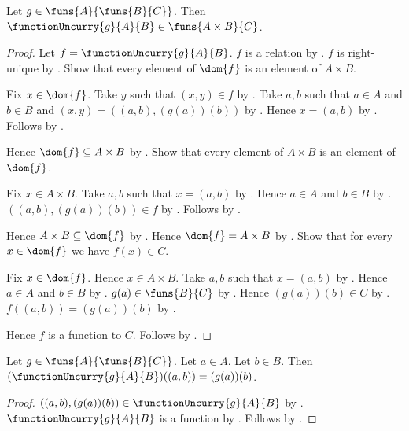 \begin{proposition}\label{function_uncurry_type}
    Let $g\in\funs{A}{\funs{B}{C}}$.
    Then $\functionUncurry{g}{A}{B}\in\funs{A\times B}{C}$.
\end{proposition}
\begin{proof}
    Let $f=\functionUncurry{g}{A}{B}$.
    $f$ is a relation by .
    $f$ is right-unique
        by .
    Show that every element of $\dom{f}$ is an element of $A\times B$.
    \begin{subproof}
        Fix $x\in\dom{f}$.
        Take $y$ such that $(x,y)\in f$ by .
        Take $a,b$ such that $a\in A$ and $b\in B$ and
            $(x,y)=((a,b),(g(a))(b))$ by .
        Hence $x=(a,b)$ by .
        Follows by .
    \end{subproof}
    Hence $\dom{f}\subseteq A\times B$ by .
    Show that every element of $A\times B$ is an element of $\dom{f}$.
    \begin{subproof}
        Fix $x\in A\times B$.
        Take $a,b$ such that $x=(a,b)$ by .
        Hence $a\in A$ and $b\in B$ by .
        $((a,b),(g(a))(b))\in f$ by .
        Follows by .
    \end{subproof}
    Hence $A\times B\subseteq\dom{f}$ by .
    Hence $\dom{f}=A\times B$ by .
    Show that for every $x\in\dom{f}$ we have $f(x)\in C$.
    \begin{subproof}
        Fix $x\in\dom{f}$.
        Hence $x\in A\times B$.
        Take $a,b$ such that $x=(a,b)$ by .
        Hence $a\in A$ and $b\in B$ by .
        $g(a)\in\funs{B}{C}$ by .
        Hence $(g(a))(b)\in C$ by .
        $f((a,b))=(g(a))(b)$
            by .
    \end{subproof}
    Hence $f$ is a function to $C$.
    Follows by .
\end{proof}

\begin{proposition}\label{function_uncurry_application}
    Let $g\in\funs{A}{\funs{B}{C}}$.
    Let $a\in A$.
    Let $b\in B$.
    Then $(\functionUncurry{g}{A}{B})((a,b))=(g(a))(b)$.
\end{proposition}
\begin{proof}
    $((a,b),(g(a))(b))\in\functionUncurry{g}{A}{B}$
        by .
    $\functionUncurry{g}{A}{B}$ is a function
        by .
    Follows by .
\end{proof}

